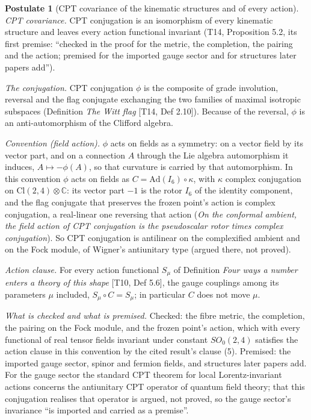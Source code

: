 \documentclass[11pt]{article}
\theoremstyle{definition}
\newtheorem{postulate}[theorem]{Postulate}
\theoremstyle{plain}
\providecommand{\C}{}\renewcommand{\C}{\mathbb{C}}
\providecommand{\Cl}{}\renewcommand{\Cl}{\mathrm{Cl}}
\begin{document}
\begin{postulate}[CPT covariance of the kinematic structures and of every action]\label{c:dark-matter.premise-cpt-covariance}
\emph{CPT covariance.} CPT conjugation is an isomorphism of every kinematic structure and leaves every action functional invariant (T14, Proposition 5.2, its first premise: ``checked in the proof for the metric, the completion, the pairing and the action; premised for the imported gauge sector and for structures later papers add'').

\emph{The conjugation.} CPT conjugation $\phi$ is the composite of grade involution, reversal and the flag conjugate exchanging the two families of maximal isotropic subspaces (Definition \emph{The Witt flag} [T14, Def 2.10]). Because of the reversal, $\phi$ is an anti-automorphism of the Clifford algebra.

\emph{Convention (field action).} $\phi$ acts on fields as a symmetry: on a vector field by its vector part, and on a connection $A$ through the Lie algebra automorphism it induces, $A \mapsto -\phi(A)$, so that curvature is carried by that automorphism. In this convention $\phi$ acts on fields as $C = \mathrm{Ad}(I_{6}) \circ \kappa$, with $\kappa$ complex conjugation on $\Cl(2,4) \otimes \C$: its vector part $-1$ is the rotor $I_{6}$ of the identity component, and the flag conjugate that preserves the frozen point's action is complex conjugation, a real-linear one reversing that action (\emph{On the conformal ambient, the field action of CPT conjugation is the pseudoscalar rotor times complex conjugation}). So CPT conjugation is antilinear on the complexified ambient and on the Fock module, of Wigner's antiunitary type (argued there, not proved).

\emph{Action clause.} For every action functional $S_{\mu}$ of Definition \emph{Four ways a number enters a theory of this shape} [T10, Def 5.6], the gauge couplings among its parameters $\mu$ included, $S_{\mu} \circ C = S_{\mu}$; in particular $C$ does not move $\mu$.

\emph{What is checked and what is premised.} Checked: the fibre metric, the completion, the pairing on the Fock module, and the frozen point's action, which with every functional of real tensor fields invariant under constant $SO_{0}(2,4)$ satisfies the action clause in this convention by the cited result's clause (5). Premised: the imported gauge sector, spinor and fermion fields, and structures later papers add. For the gauge sector the standard CPT theorem for local Lorentz-invariant actions concerns the antiunitary CPT operator of quantum field theory; that this conjugation realises that operator is argued, not proved, so the gauge sector's invariance ``is imported and carried as a premise''.
\end{postulate}
\end{document}
